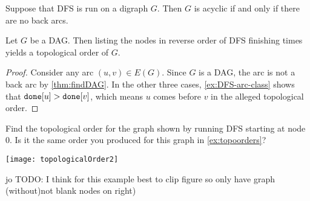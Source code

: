 \begin{Theorem} \label{thm:findDAG}
Suppose that DFS is run on a digraph $G$. Then $G$ is acyclic if and only if there are no back arcs.
\end{Theorem}
%

\begin{Theorem}
Let $G$ be a DAG. Then listing the nodes in reverse order of DFS
finishing times yields a topological order of $G$.
\end{Theorem}
\begin{proof} 
Consider any arc $(u,v) \in E(G)$. 
Since $G$ is a DAG, the arc is not a back arc by \cref{thm:findDAG}. 
In the other three cases, \cref{ex:DFS-arc-class} shows that $\operatorname{\text{\texttt{done}}}[u] > \operatorname{\text{\texttt{done}}}[v]$,
which means $u$ comes before $v$ in the alleged topological order.
\end{proof}




\begin{Boxample}[0] 
Find the topological order for the graph shown by running DFS starting at node $0$.  Is it the same order you produced for this graph in \cref{ex:topoorders}?
\begin{center}
\texttt{[image: topologicalOrder2]}
\end{center}
jo TODO: I think for this example best to clip figure so only have graph (without)not blank nodes on right) 
\end{Boxample}


